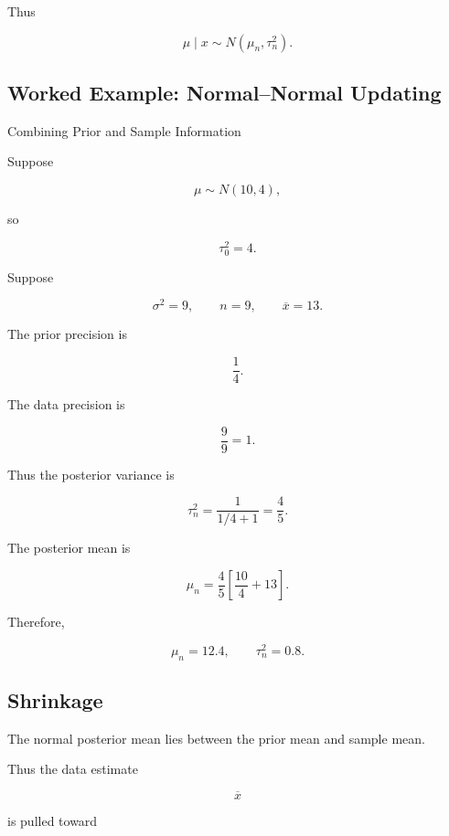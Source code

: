 Thus

\[
\boxed{
\mu\mid x
\sim
N(\mu_n,\tau_n^2).
}
\]

\subsection{Worked Example: Normal--Normal Updating}
\label{subsec:worked-normal-normal}

\begin{workedexamplebox}{Combining Prior and Sample Information}

Suppose

\[
\mu
\sim
N(10,4),
\]

so

\[
\tau_0^2=4.
\]

Suppose

\[
\sigma^2=9,
\qquad
n=9,
\qquad
\overline{x}=13.
\]

The prior precision is

\[
\frac14.
\]

The data precision is

\[
\frac9{9}=1.
\]

Thus the posterior variance is

\[
\tau_n^2
=
\frac1{
1/4+1
}
=
\frac45.
\]

The posterior mean is

\[
\mu_n
=
\frac45
\left[
\frac{10}{4}
+
13
\right].
\]

Therefore,

\begin{answerbox}
\[
\boxed{
\mu_n
=
12.4,
\qquad
\tau_n^2
=
0.8.
}
\]
\end{answerbox}

\end{workedexamplebox}

\subsection{Shrinkage}
\label{subsec:bayesian-shrinkage}

The normal posterior mean lies between the prior mean and sample mean.

Thus the data estimate

\[
\overline{x}
\]

is pulled toward

